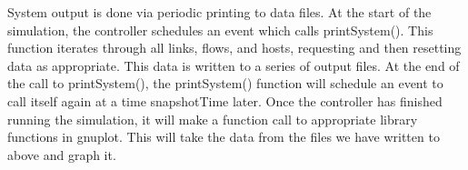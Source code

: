     System output is done via periodic printing to data files. At the start of the simulation, the controller schedules an event which calls printSystem(). This function iterates through all links, flows, and hosts, requesting and then resetting data as appropriate. This data is written to a series of output files. At the end of the call to printSystem(), the printSystem() function will schedule an event to call itself again at a time snapshotTime later.
    Once the controller has finished running the simulation, it will make a function call to appropriate library functions in gnuplot. This will take the data from the files we have written to above and graph it. 


